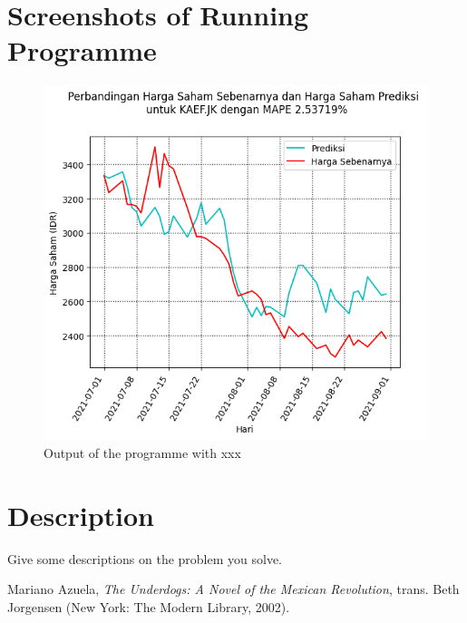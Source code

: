 \documentclass[english,12pt,a4paper,final]{article}
\begin{document}
	\section{Screenshots of Running Programme}
	\begin{figure}
		\centering
		\includegraphics[width=\linewidth]{KAEF}
		\caption{Output of the programme with xxx}
		\label{fig:kaef}
	\end{figure}
	
	\section{Description}
	Give some descriptions on the problem you solve.
	
	\begin{thebibliography}{9} 
		 Mariano Azuela, \textit{The Underdogs: A Novel of the Mexican Revolution}, trans. Beth Jorgensen (New York: The Modern Library, 2002). 
	\end{thebibliography}
\end{document}
